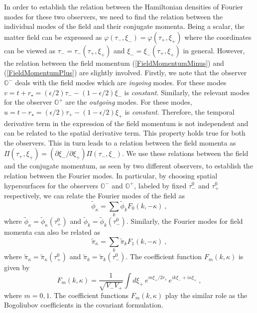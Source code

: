 \documentclass[aps,12pt,showpacs]{revtex4-2}
\def\kr{\kappa}
\def\rs{r_s}
\def\rstar{r_{\star}}
\def\observerminus{\mathbb{O}^{-}}
\def\observerplus{\mathbb{O}^{+}}
\begin{document}
In order to establish the relation between the Hamiltonian densities of Fourier 
modes for these two observers, we need to find the relation between the 
individual modes of the field and their conjugate momenta. Being a scalar, the 
matter field can be expressed as $\varphi(\tau_{-},\xi_{-}) = 
\varphi(\tau_{+},\xi_{+})$ where the coordinates can be viewed as $\tau_{-} = 
\tau_{-}(\tau_{+},\xi_{+})$ and $\xi_{-} = \xi_{-}(\tau_{+},\xi_{+})$ in 
general. However, the relation between the field momentum 
(\ref{FieldMomentumMinus}) and (\ref{FieldMomentumPlus}) are slightly involved. 
Firstly, we note that the observer $\observerminus$ deals with the field modes 
which are \emph{ingoing} modes. For these modes $v = t + \rstar = 
(\epsilon/2)\tau_{-} - (1-\epsilon/2) \xi_{-}$  is \emph{constant}. Similarly, 
the relevant modes for the observer $\observerplus$ are the \emph{outgoing} 
modes. For these modes, $u = t - \rstar = (\epsilon/2)\tau_{+} - (1-\epsilon/2) 
\xi_{+}$ is \emph{constant}. Therefore, the temporal derivative term in the 
expression of the field momentum is not independent and can be related to the 
spatial derivative term. This property holds true for both the observers. This 
in turn leads to a relation between the field momenta as $\Pi(\tau_{+},\xi_{+}) 
= (\partial \xi_{-}/\partial \xi_{+}) \Pi(\tau_{-},\xi_{-})$.
%
We use these relations between the field and the conjugate momentum, as seen by 
two different observers, to establish the relation between the Fourier modes. In 
particular, by choosing spatial hypersurfaces for the observers $\observerminus$ 
and $\observerplus$, labeled by fixed $\tau_{-}^0$ and $\tau_{+}^0$ 
respectively, we can relate the Fourier modes of the field as
%
\begin{equation}\label{FieldModesRelation}
\tilde{\phi}_{\kr} = \sum_{k} \tilde{\phi}_{k} F_{0}(k,-\kr) ~,
\end{equation}
%
where $\tilde{\phi}_{\kr} = \tilde{\phi}_{\kr}(\tau_{+}^0)$ and 
$\tilde{\phi}_{k} = \tilde{\phi}_{k}(\tau_{-}^0)$. Similarly, the Fourier modes 
for field momenta can also be related as
%
\begin{equation}\label{FieldMomentaModesRelation}
\tilde{\pi}_{\kr} =  \sum_{k} \tilde{\pi}_{k} F_{1}(k,-\kr)  ~,
\end{equation}
%
where $\tilde{\pi}_{\kr} = \tilde{\pi}_{\kr}(\tau_{+}^0)$ and 
$\tilde{\pi}_{k} = \tilde{\pi}_{k}(\tau_{-}^0)$. The coefficient function
$F_{m}(k,\kr)$ is given by
%
\begin{equation}\label{FFunctionGeneral}
F_{m}(k,\kr) = \frac{1}{\sqrt{V_{-} V_{+}}} 
\int d\xi_{+} ~e^{m\xi_{+}/2 \rs} ~e^{i k \xi_{-} + 
i \kr \xi_{+}} ~,
\end{equation}
%
where $m=0,1$. The coefficient functions $F_{m}(k,\kr)$ play the similar role 
as the Bogoliubov coefficients in the covariant formulation.
\end{document}
